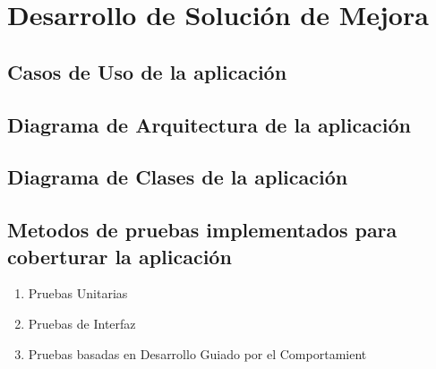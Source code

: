 \documentclass[preprint,12pt]{elsarticle}
\begin{document}
\section{Desarrollo de Solución de Mejora}
\subsection{\textbf{ Casos de Uso de la aplicación}}
\subsection{\textbf{ Diagrama de Arquitectura de la aplicación }}
\subsection{\textbf{ Diagrama de Clases de la aplicación }}
\subsection{\textbf{  Metodos de pruebas implementados para coberturar la aplicación }}
\renewcommand{\labelenumi}{{\theenumi})}
\begin{enumerate}
\item  Pruebas Unitarias  
\item  Pruebas de Interfaz  
\item Pruebas basadas en Desarrollo Guiado por el Comportamient
\end{enumerate}

	\newpage
	
		
\end{document}
